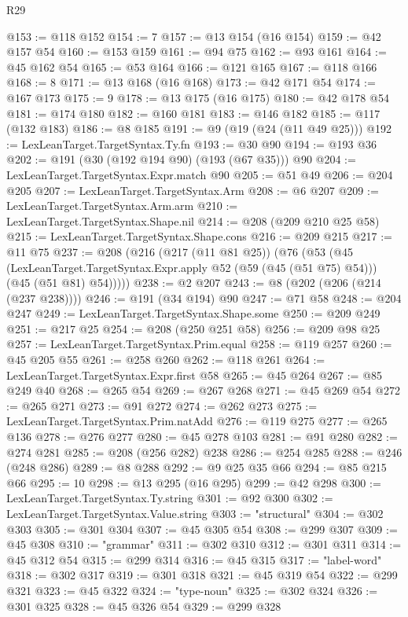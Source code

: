 \begin{lexlean}{R29}
\begin{coremodule}
@153 := @118 @152
@154 := 7
@157 := @13 @154 (@16 @154)
@159 := @42 @157 @54
@160 := @153 @159
@161 := @94 @75
@162 := @93 @161
@164 := @45 @162 @54
@165 := @53 @164
@166 := @121 @165
@167 := @118 @166
@168 := 8
@171 := @13 @168 (@16 @168)
@173 := @42 @171 @54
@174 := @167 @173
@175 := 9
@178 := @13 @175 (@16 @175)
@180 := @42 @178 @54
@181 := @174 @180
@182 := @160 @181
@183 := @146 @182
@185 := @117 (@132 @183)
@186 := @8 @185
@191 := @9 (@19 (@24 (@11 @49 @25)))
@192 := LexLeanTarget.TargetSyntax.Ty.fn
@193 := @30 @90
@194 := @193 @36
@202 := @191 (@30 (@192 @194 @90) (@193 (@67 @35))) @90
@204 := LexLeanTarget.TargetSyntax.Expr.match @90
@205 := @51 @49
@206 := @204 @205
@207 := LexLeanTarget.TargetSyntax.Arm
@208 := @6 @207
@209 := LexLeanTarget.TargetSyntax.Arm.arm
@210 := LexLeanTarget.TargetSyntax.Shape.nil
@214 := @208 (@209 @210 @25 @58)
@215 := LexLeanTarget.TargetSyntax.Shape.cons
@216 := @209 @215
@217 := @11 @75
@237 := @208
    (@216
      (@217 (@11 @81 @25))
      (@76
        (@53
          (@45
            (LexLeanTarget.TargetSyntax.Expr.apply @52 (@59 (@45 (@51 @75) @54)))
            (@45 (@51 @81) @54)))))
@238 := @2 @207
@243 := @8 (@202 (@206 (@214 (@237 @238))))
@246 := @191 (@34 @194) @90
@247 := @71 @58
@248 := @204 @247
@249 := LexLeanTarget.TargetSyntax.Shape.some
@250 := @209 @249
@251 := @217 @25
@254 := @208 (@250 @251 @58)
@256 := @209 @98 @25
@257 := LexLeanTarget.TargetSyntax.Prim.equal
@258 := @119 @257
@260 := @45 @205 @55
@261 := @258 @260
@262 := @118 @261
@264 := LexLeanTarget.TargetSyntax.Expr.first @58
@265 := @45 @264
@267 := @85 @249 @40
@268 := @265 @54
@269 := @267 @268
@271 := @45 @269 @54
@272 := @265 @271
@273 := @91 @272
@274 := @262 @273
@275 := LexLeanTarget.TargetSyntax.Prim.natAdd
@276 := @119 @275
@277 := @265 @136
@278 := @276 @277
@280 := @45 @278 @103
@281 := @91 @280
@282 := @274 @281
@285 := @208 (@256 @282) @238
@286 := @254 @285
@288 := @246 (@248 @286)
@289 := @8 @288
@292 := @9 @25 @35 @66
@294 := @85 @215 @66
@295 := 10
@298 := @13 @295 (@16 @295)
@299 := @42 @298
@300 := LexLeanTarget.TargetSyntax.Ty.string
@301 := @92 @300
@302 := LexLeanTarget.TargetSyntax.Value.string
@303 := "structural"
@304 := @302 @303
@305 := @301 @304
@307 := @45 @305 @54
@308 := @299 @307
@309 := @45 @308
@310 := "grammar"
@311 := @302 @310
@312 := @301 @311
@314 := @45 @312 @54
@315 := @299 @314
@316 := @45 @315
@317 := "label-word"
@318 := @302 @317
@319 := @301 @318
@321 := @45 @319 @54
@322 := @299 @321
@323 := @45 @322
@324 := "type-noun"
@325 := @302 @324
@326 := @301 @325
@328 := @45 @326 @54
@329 := @299 @328

\end{coremodule}
\end{lexlean}
